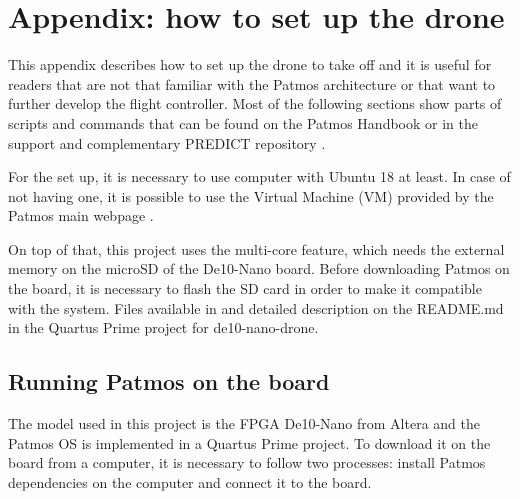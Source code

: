 \chapter{Appendix: how to set up the drone}\label{app:setup}
This appendix describes how to set up the drone to take off and it is useful for readers that are not that familiar with the Patmos architecture or that want to further develop the flight controller.
Most of the following sections show parts of scripts and commands that can be found on the Patmos Handbook \cite{bib:patmos_hnd} or in the support and complementary PREDICT repository \cite{bib:pred_repo}.

For the set up, it is necessary to use computer with Ubuntu 18 at least. In case of not having one, it is possible to use the Virtual Machine (VM) provided by the Patmos main webpage \cite{bib:patmos_page}.

On top of that, this project uses the multi-core feature, which needs the external memory on the microSD of the De10-Nano board. Before downloading Patmos on the board, it is necessary to flash the SD card in order to make it compatible with the system. Files available in \cite{bib:microSD} and detailed description on the README.md in the Quartus Prime project for de10-nano-drone.

\section*{Running Patmos on the board}
The model used in this project is the FPGA De10-Nano from Altera and the Patmos OS is implemented in a Quartus Prime project. To download it on the board from a computer, it is necessary to follow two processes: install Patmos dependencies on the computer and connect it to the board.

